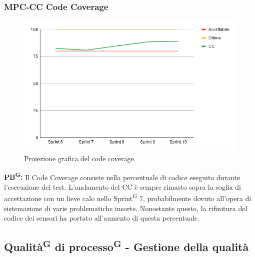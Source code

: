 \documentclass[8pt]{article}
\newcommand{\glossterm}[1]{#1\textsuperscript{G}} %
\begin{document}
\subsubsection{MPC-CC Code Coverage}
\begin{figure}[h!]
    \centering
    \includegraphics[width=1\textwidth]{images_pdq/CC.png}
    \caption{Proiezione grafica del code coverage.}
    \label{fig:Proiezione grafica del code coverage}
\end{figure}
\textbf{\glossterm{PB}:} Il Code Coverage consiste nella percentuale di codice eseguito durante l'esecuzione dei test. L'andamento del CC è sempre rimasto sopra la soglia di accettazione con un lieve calo nello \glossterm{Sprint} 7, probabilmente dovuto all'opera di sistemazione di varie problematiche insorte. Nonostante questo, la rifinitura del codice dei sensori ha portato all'aumento di questa percentuale.
\clearpage
\subsection{\glossterm{Qualità} di \glossterm{processo} - Gestione della qualità}
\end{document}
